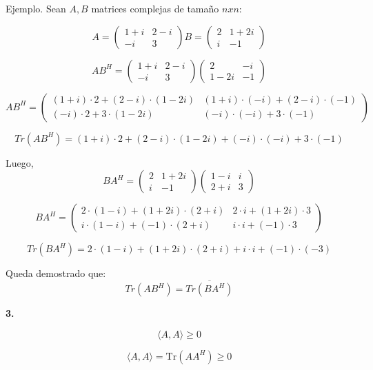\documentclass{article}
\begin{document}
Ejemplo. Sean \( A, B \) matrices complejas de tamaño \( nxn \):

\[
A = \begin{pmatrix}
1 + i & 2 - i \\
-i & 3
\end{pmatrix}
B = \begin{pmatrix}
    2  & 1 + 2i \\
    i & -1
    \end{pmatrix}
\]  
    
\[
AB^H = 
\begin{pmatrix}
1 + i & 2 - i \\
-i & 3
\end{pmatrix}
\begin{pmatrix}
2 & -i \\
1-2i & -1
\end{pmatrix}
\]
        
\[
AB^H = \begin{pmatrix}
(1+i)\cdot 2 + (2-i)\cdot (1-2i) & (1+i)\cdot(-i) + (2-i)\cdot(-1) \\
(-i)\cdot 2 + 3\cdot (1-2i) & (-i)\cdot (-i) + 3\cdot (-1)
\end{pmatrix}
\]

\[
Tr(AB^H) = (1+i)\cdot 2 + (2-i)\cdot (1-2i) + (-i)\cdot (-i) + 3\cdot (-1)
\]

Luego,
\[
BA^H = 
\begin{pmatrix}
    2  & 1 + 2i \\
    i & -1
    \end{pmatrix}
\begin{pmatrix}
    1-i  & i \\
    2+i & 3
    \end{pmatrix}    
\]

\[
BA^H = 
\begin{pmatrix}
    2 \cdot (1 - i) + (1 + 2i) \cdot (2 + i) & 2 \cdot i + (1 + 2i) \cdot 3 \\
    i \cdot (1 - i) + (-1) \cdot (2 + i) & i \cdot i + (-1) \cdot 3
\end{pmatrix}
\]

\[
Tr(BA^H) = 2\cdot (1-i) + (1+2i)\cdot (2+i) + i\cdot i + (-1) \cdot (-3)
\]

Queda demostrado que: 
\[
    Tr(AB^H) = \overline{Tr(BA^H)}
\]

\textbf{3.}

\[
\langle A, A \rangle \geq 0
\]

\[
\langle A, A \rangle  =  \text{Tr}(A A^H) \geq 0 
\]
\end{document}
